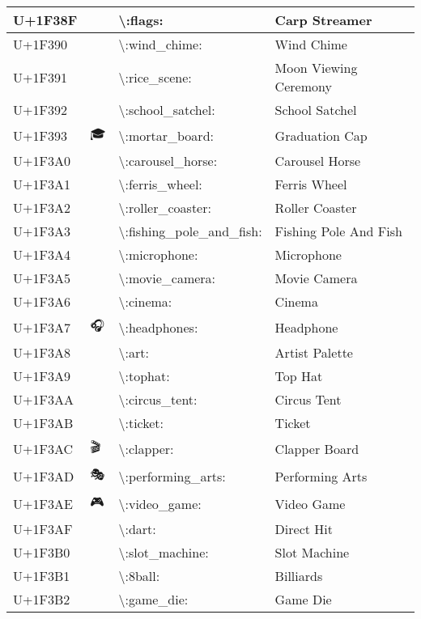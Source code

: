 \begin{table}[h]
\begin{tabulary}{\linewidth}{|L|L|L|L|}
\hline
U+1F38F & 🎏 & {\textbackslash}:flags: & Carp Streamer \\
\hline
U+1F390 & 🎐 & {\textbackslash}:wind\_chime: & Wind Chime \\
\hline
U+1F391 & 🎑 & {\textbackslash}:rice\_scene: & Moon Viewing Ceremony \\
\hline
U+1F392 & 🎒 & {\textbackslash}:school\_satchel: & School Satchel \\
\hline
U+1F393 & 🎓 & {\textbackslash}:mortar\_board: & Graduation Cap \\
\hline
U+1F3A0 & 🎠 & {\textbackslash}:carousel\_horse: & Carousel Horse \\
\hline
U+1F3A1 & 🎡 & {\textbackslash}:ferris\_wheel: & Ferris Wheel \\
\hline
U+1F3A2 & 🎢 & {\textbackslash}:roller\_coaster: & Roller Coaster \\
\hline
U+1F3A3 & 🎣 & {\textbackslash}:fishing\_pole\_and\_fish: & Fishing Pole And Fish \\
\hline
U+1F3A4 & 🎤 & {\textbackslash}:microphone: & Microphone \\
\hline
U+1F3A5 & 🎥 & {\textbackslash}:movie\_camera: & Movie Camera \\
\hline
U+1F3A6 & 🎦 & {\textbackslash}:cinema: & Cinema \\
\hline
U+1F3A7 & 🎧 & {\textbackslash}:headphones: & Headphone \\
\hline
U+1F3A8 & 🎨 & {\textbackslash}:art: & Artist Palette \\
\hline
U+1F3A9 & 🎩 & {\textbackslash}:tophat: & Top Hat \\
\hline
U+1F3AA & 🎪 & {\textbackslash}:circus\_tent: & Circus Tent \\
\hline
U+1F3AB & 🎫 & {\textbackslash}:ticket: & Ticket \\
\hline
U+1F3AC & 🎬 & {\textbackslash}:clapper: & Clapper Board \\
\hline
U+1F3AD & 🎭 & {\textbackslash}:performing\_arts: & Performing Arts \\
\hline
U+1F3AE & 🎮 & {\textbackslash}:video\_game: & Video Game \\
\hline
U+1F3AF & 🎯 & {\textbackslash}:dart: & Direct Hit \\
\hline
U+1F3B0 & 🎰 & {\textbackslash}:slot\_machine: & Slot Machine \\
\hline
U+1F3B1 & 🎱 & {\textbackslash}:8ball: & Billiards \\
\hline
U+1F3B2 & 🎲 & {\textbackslash}:game\_die: & Game Die \\

\end{tabulary}
\end{table}
